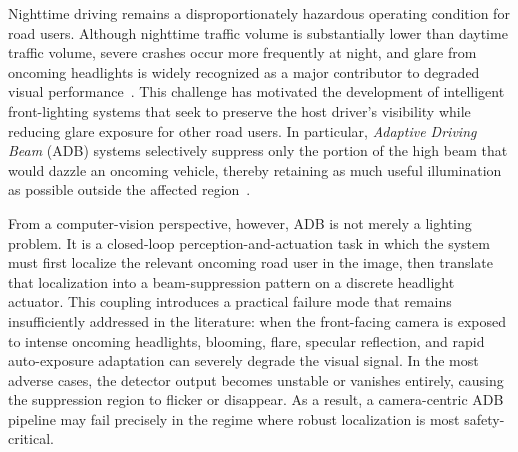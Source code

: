 \documentclass[pdflatex,sn-mathphys-num]{sn-jnl}%
\theoremstyle{thmstyleone}%
\theoremstyle{thmstyletwo}%
\theoremstyle{thmstylethree}%
\begin{document}
Nighttime driving remains a disproportionately hazardous operating
condition for road users. Although nighttime traffic volume is
substantially lower than daytime traffic volume, severe crashes occur
more frequently at night, and glare from oncoming headlights is widely
recognized as a major contributor to degraded visual
performance~\cite{fhwa2025nightvisibility,hwang2018headlightglare,beard2025glarelitreview}.
This challenge has motivated the development of intelligent front-lighting systems that seek to preserve the host driver's visibility while
reducing glare exposure for other road users. In particular, \emph{Adaptive Driving Beam} (ADB) systems selectively suppress only the portion of the high beam that would dazzle an oncoming vehicle, thereby retaining as much useful illumination as possible outside the affected region~\cite{Neumann2014ADB,Shin2026DOE_AFS}.

From a computer-vision perspective, however, ADB is not merely a lighting problem. It is a closed-loop perception-and-actuation task in which the system must first localize the relevant oncoming road user in the image, then translate that localization into a beam-suppression pattern on a discrete headlight actuator. This coupling introduces a practical failure mode that remains insufficiently addressed in the literature: when the front-facing camera is exposed to intense oncoming headlights, blooming, flare, specular reflection, and rapid auto-exposure adaptation can severely degrade the visual signal. In the
most adverse cases, the detector output becomes unstable or vanishes entirely, causing the suppression region to flicker or disappear. As a
result, a camera-centric ADB pipeline may fail precisely in the regime where robust localization is most safety-critical.
\end{document}
